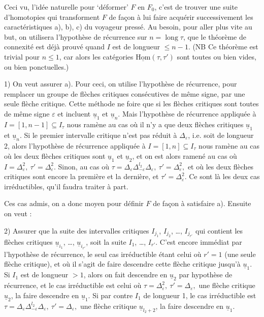 \documentclass[11pt]{article}
\newcommand{\printedpage}[1]{\marginpar{\footnotesize p.~#1}}
\newcommand{\msp}[1]{\marginpar{\vspace*{10pt}\footnotesize [#1]}}
\newcommand{\uHom}{\underline{\mathrm{Hom}}}
\newcommand{\ul}[1]{\underline{#1}}
\begin{document}
\msp{page 89}
Ceci vu, l'idée naturelle pour ‘déformer’ $F$ en $F_0$, c'est de trouver une suite d'homotopies qui transforment $F$ de façon à lui faire acquérir successivement les caractéristiques a), b), c) du voyageur pressé. Au besoin, pour aller plus vite au but, on utilisera l'hypothèse de récurrence sur $n=\operatorname{long}\tau$, que le théorème de connexité est déjà prouvé quand $I$ est de longueur $\leq n-1$. (NB Ce théorème est trivial pour $n\leq1$, car alors les catégories $\uHom(\tau,\tau')$ sont toutes ou bien vides, ou bien ponctuelles.)

\msp{page 90}
1) On veut assurer a). Pour ceci, on utilise l'hypothèse de récurrence, pour remplacer un groupe de flèches critiques consécutives de même signe, par une seule flèche critique. Cette méthode ne foire que si les flèches critiques sont toutes de même signe $\varepsilon$ et incluent $\ul{u}_1$ et $\ul{u}_n$. Mais l'hypothèse de récurrence appliquée à $I=[1,n-1]\subseteq I_\tau$ nous ramène au cas où il n'y a que deux flèches critiques $\ul{u}_1$ et $\ul{u}_n$. Si le premier intervalle critique n'est pas réduit à $\Delta_\varepsilon$, i.e. soit de longueur 2, alors l'hypothèse de récurrence appliquée à $I=[1,n]\subseteq I_\tau$ nous ramène au cas où les deux flèches critiques sont $\ul{u}_1$ et $\ul{u}_2$, et on est
\printedpage{58}
\msp{page 91}
alors ramené au cas où $\boxed{I=\Delta^2_\varepsilon,\ \tau'=\Delta^2_\varepsilon.}$ Sinon, au cas où $\boxed{\tau=\Delta_\varepsilon\Delta^{l_2}_{-\varepsilon}\Delta_\varepsilon,\ \tau'=\Delta^2_\varepsilon,}$ et où les deux flèches critiques sont encore la première et la dernière, et $\tau'=\Delta^2_\varepsilon$. Ce sont là les deux cas irréductibles, qu'il faudra traiter à part.

Ces cas admis, on a donc moyen pour définir $F$ de façon à satisfaire a). Ensuite on veut :

2) Assurer que la suite des intervalles critiques $I_{j_1}$, $I_{j_2}$, \dots, $I_{j_{r'}}$ qui contient les flèches critiques $\ul{u}_{i_1}$, \dots, $\ul{u}_{i_{r'}}$, soit la suite $I_1$, \dots, $I_{r'}$. C'est encore immédiat par l'hypothèse de récurrence, le seul cas irréductible étant celui où $r'=1$ (une seule flèche critique), et où il s'agit de faire descendre cette flèche critique jusqu'à $\ul{u}_1$. Si $I_1$ est de longueur $>1$, alors on fait descendre en $\ul{u}_2$ par hypothèse de récurrence, et le cas irréductible est celui où $\boxed{\tau=\Delta^2_\varepsilon,\ \tau'=\Delta_\varepsilon,}$ une flèche critique $\ul{u}_2$, la faire descendre en $\ul{u}_1$. Si par contre $I_1$ de longueur 1, le cas irréductible est $\boxed{\tau=\Delta_\varepsilon\Delta^{l_2}_{-\varepsilon}\Delta_\varepsilon,\ \tau'=\Delta_\varepsilon,}$ une flèche critique $\ul{u}_{l_2+2}$, la faire descendre en $\ul{u}_1$.
\end{document}
